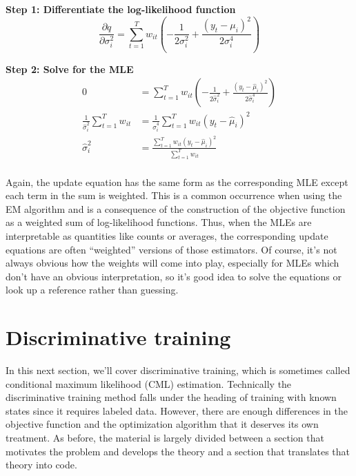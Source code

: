 \textbf{Step 1: Differentiate the log-likelihood function}
\begin{equation*}
\frac{\partial q}{\partial \sigma_i^2} = \sum_{t=1}^T w_{it}
                                         \left( -\frac{1}{2 \sigma_i^2}
                                                + \frac{\left( y_t - \mu_i \right)^2}{2 \sigma_i^4}
                                         \right)
\end{equation*}

\textbf{Step 2: Solve for the MLE}
\begin{align*}
0 &= \sum_{t=1}^T w_{it}
     \left( -\frac{1}{2 \hat{\sigma}_i^2}
            + \frac{\left( y_t - \hat{\mu}_i \right)^2}{2 \hat{\sigma}_i^4}
     \right) \\
\frac{1}{\hat{\sigma}_i^2} \sum_{t=1}^T w_{it} &= \frac{1}{\hat{\sigma}_i^4}
                                                  \sum_{t=1}^T w_{it} \left( y_t - \hat{\mu}_i \right)^2 \\
\hat{\sigma}_i^2 &= \frac{\sum_{t=1}^T w_{it} \left( y_t - \hat{\mu}_i \right)^2}
                         {\sum_{t=1}^T w_{it}} \\
\end{align*}

Again, the update equation has the same form as the corresponding MLE except each term in the sum is weighted. This is a common occurrence when using the EM algorithm and is a consequence of the construction of the objective function as a weighted sum of log-likelihood functions. Thus, when the MLEs are interpretable as quantities like counts or averages, the corresponding update equations are often ``weighted'' versions of those estimators. Of course, it's not always obvious how the weights will come into play, especially for MLEs which don't have an obvious interpretation, so it's good idea to solve the equations or look up a reference rather than guessing.

\section{Discriminative training}

In this next section, we'll cover discriminative training, which is sometimes called conditional maximum likelihood (CML) estimation. Technically the discriminative training method falls under the heading of training with known states since it requires labeled data. However, there are enough differences in the objective function and the optimization algorithm that it deserves its own treatment. As before, the material is largely divided between a section that motivates the problem and develops the theory and a section that translates that theory into code.

